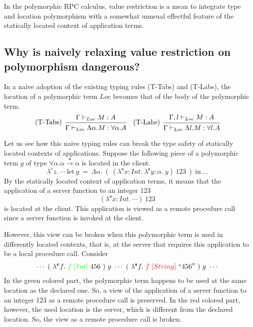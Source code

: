 \documentclass[a4paper]{article}
\theoremstyle{plain}
\theoremstyle{definition}
\newcommand{\client}{\textbf{c}}
\newcommand{\server}{\textbf{s}}
\newcommand{\funL}[1]{\xrightarrow{#1}}
\newcommand{\tyenv}{\Gamma}
\newcommand{\tyenvExtWith}[1]{\Gamma,#1}
\newcommand{\typing}[4]{#1\vdash_{#2} #3 : #4}
\newcommand{\Loc}{Loc}
\begin{document}
%
In the polymorphic RPC calculus, value restriction is a mean to
integrate type and location polymorphism with a somewhat unusual
effectful feature of the statically located context of application
terms.

\subsection{Why is naively relaxing value restriction on polymorphism dangerous?}

%
In a naive adoption of the existing typing rules (T-Tabs) and
(T-Labs), the location of a polymorphic term $\Loc$ becomes that of
the body of the polymorphic term.
\[
    \begin{prooftree}
      \hypo{  \typing{\tyenv}{\Loc}{M}{A}}
      \infer[left label=(T-Tabs)]1{ \typing{\tyenv}{\Loc}{\Lambda\alpha. M}{\forall\alpha. A}   }
    \end{prooftree}
    \ \ \
    \begin{prooftree}
      \hypo{ \typing{\tyenvExtWith{l}}{\Loc}{M}{A}}
      \infer[left label=(T-Labs)]1{ \typing{\tyenv}{\Loc}{\Lambda l. M}{\forall l. A }}
    \end{prooftree}
\]

%
Let us see how this naive typing rules can break the type safety of
statically located contexts of applications.
%
Suppose the following piece of a polymorphic term $g$ of type
$\forall\alpha.\alpha\funL{\server}\alpha$ is located in the client.
\[
\lambda^c z. \ \cdots \ \mbox{let} \  g \ = \ \Lambda\alpha. \ ( \  (\lambda^\server x:Int. \ \lambda^\server y:\alpha. \ y) \ 123  \ ) \ \mbox{in} \ ...
\]
%
By the statically located context of application terms, it means that
the application of a server function to an integer 123
\[
(\lambda^\server x:Int. \ \cdots) \ 123
\]
is located at the client.
%
This application is viewed as a remote
procedure call since a server function is invoked at the client.

%
However, this view can be broken when this polymorphic term is used in
differently located contexts, that is, at the server that requires
this application to be a local procedure call. Consider
%
\[
\cdots
\ ( \ \lambda^\client f. \ {\color{green} f \ [Int]} \ 456 \ ) \ g \
\cdots
\ ( \ \lambda^\server f. \ {\color{red} f \ [String]} \ ``456'' \ ) \ g \
\cdots
\]
%
In the green colored part, the polymorphic term happens to be used at
the same location as the declared one.
%
So, a view of the application of a server function to an integer 123
as a remote procedure call is preserved.
%
In the red colored part, however, the used location is the server,
which is different from the declared location.
%
So, the view as a remote procedure call is broken.
\end{document}
